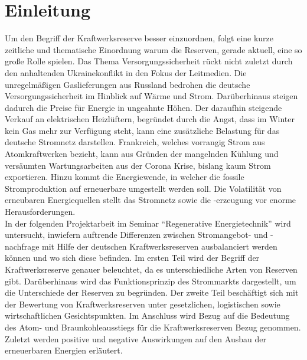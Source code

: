 \section{Einleitung}

	Um den Begriff der Kraftwerksreserve besser einzuordnen, folgt eine kurze zeitliche und thematische Einordnung warum die Reserven, gerade aktuell, eine so große Rolle spielen.
	Das Thema Versorgungssicherheit rückt nicht zuletzt durch den anhaltenden Ukrainekonflikt in den Fokus der Leitmedien.
	Die unregelmäßigen Gaslieferungen aus Russland bedrohen die deutsche Versorgungssicherheit im Hinblick auf Wärme und Strom.
	Darüberhinaus steigen dadurch die Preise für Energie in ungeahnte Höhen.
	Der daraufhin steigende Verkauf an elektrischen Heizlüftern, begründet durch die Angst, dass im Winter kein Gas mehr zur Verfügung steht, kann eine zusätzliche Belastung für das deutsche Stromnetz darstellen.
	Frankreich, welches vorrangig Strom aus Atomkraftwerken bezieht, kann aus Gründen der mangelnden Kühlung und versäumten Wartungsarbeiten aus der Corona Krise, bislang kaum Strom exportieren.
	Hinzu kommt die Energiewende, in welcher die fossile Stromproduktion auf erneuerbare umgestellt werden soll. 
	Die Volatilität von erneubaren Energiequellen stellt das Stromnetz sowie die -erzeugung vor enorme Herausforderungen. \\
	
	In der folgenden Projektarbeit im Seminar "`Regenerative Energietechnik"' wird untersucht, inwiefern auftrende Differenzen zwischen Stromangebot- und -nachfrage mit Hilfe der deutschen Kraftwerksreserven ausbalanciert werden können und wo sich diese befinden.
	Im ersten Teil wird der Begriff der Kraftwerksreserve genauer beleuchtet, da es unterschiedliche Arten von Reserven gibt.
	Darüberhinaus wird das Funktionsprinzip des Strommarkts dargestellt, um die Unterschiede der Reserven zu begründen.
	Der zweite Teil beschäftigt sich mit der Bewertung von Kraftwerksreserven unter gesetzlichen, logistischen sowie wirtschaftlichen Gesichtspunkten.
	Im Anschluss wird Bezug auf die Bedeutung des Atom- und Braunkohleausstiegs für die Kraftwerksreserven Bezug genommen.	
	Zuletzt werden positive und negative Auswirkungen auf den Ausbau der erneuerbaren Energien erläutert.
	
	
	
	
	\clearpage